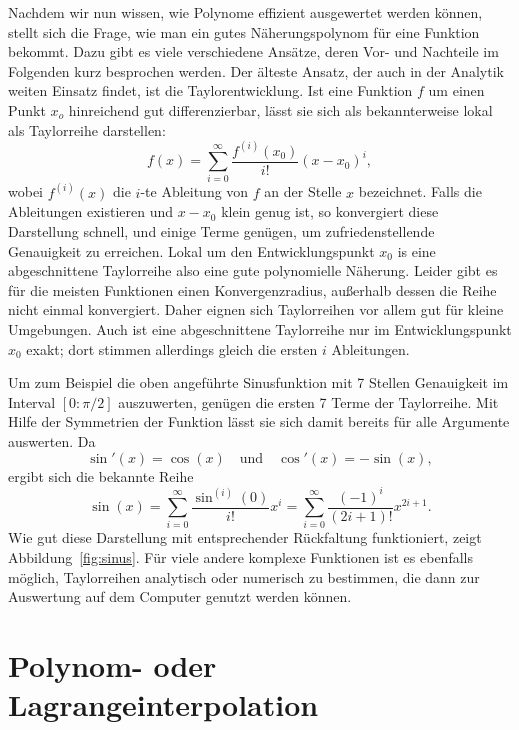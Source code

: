 Nachdem wir nun wissen, wie Polynome effizient ausgewertet werden
können, stellt sich die Frage, wie man ein gutes Näherungspolynom für
eine Funktion bekommt. Dazu gibt es viele verschiedene Ansätze, deren
Vor- und Nachteile im Folgenden kurz besprochen werden. Der älteste
Ansatz, der auch in der Analytik weiten Einsatz findet, ist die
Taylorentwicklung.  Ist eine Funktion $f$ um einen Punkt $x_o$
hinreichend gut differenzierbar, lässt sie sich als bekannterweise
lokal als Taylorreihe darstellen:
\begin{equation}
  f(x) = \sum_{i=0}^\infty \frac{f^{(i)}(x_0)}{i!} (x-x_0)^i,
  \label{eq:taylor}
\end{equation}
wobei $f^{(i)}(x)$ die $i$-te Ableitung von $f$ an der Stelle $x$
bezeichnet.  Falls die Ableitungen existieren und $x-x_0$ klein genug
ist, so konvergiert diese Darstellung schnell, und einige Terme
genügen, um zufriedenstellende Genauigkeit zu erreichen. Lokal um den
Entwicklungspunkt $x_0$ is eine abgeschnittene Taylorreihe also eine
gute polynomielle Näherung. Leider gibt es für die meisten Funktionen
einen Konvergenzradius, außerhalb dessen die Reihe nicht einmal
konvergiert. Daher eignen sich Taylorreihen vor allem gut für kleine
Umgebungen. Auch ist eine abgeschnittene Taylorreihe nur im
Entwicklungspunkt $x_0$ exakt; dort stimmen allerdings gleich die
ersten $i$ Ableitungen.

Um  zum  Beispiel die  oben  angeführte  Sinusfunktion  mit 7  Stellen
Genauigkeit im Interval $[0:\pi/2]$  auszuwerten, genügen die ersten 7
Terme der Taylorreihe. Mit Hilfe der Symmetrien der Funktion lässt sie
sich damit bereits für alle Argumente auswerten. Da
\begin{equation*}
  \sin'(x) = \cos(x) \quad\text{und} \quad \cos'(x) = -\sin(x),
\end{equation*}
ergibt sich die bekannte Reihe
\begin{equation}
  \sin(x) = \sum_{i=0}^\infty \frac{\sin^{(i)}(0)}{i!} x^i =
  \sum_{i=0}^\infty \frac{(-1)^i}{(2i+1)!} x^{2i+1}.
\end{equation}
Wie gut diese Darstellung mit entsprechender Rückfaltung funktioniert,
zeigt Abbildung~\ref{fig:sinus}.  Für viele andere komplexe Funktionen
ist es ebenfalls möglich, Taylorreihen analytisch oder numerisch zu
bestimmen, die dann zur Auswertung auf dem Computer genutzt werden
können.

\section{Polynom- oder Lagrangeinterpolation}

